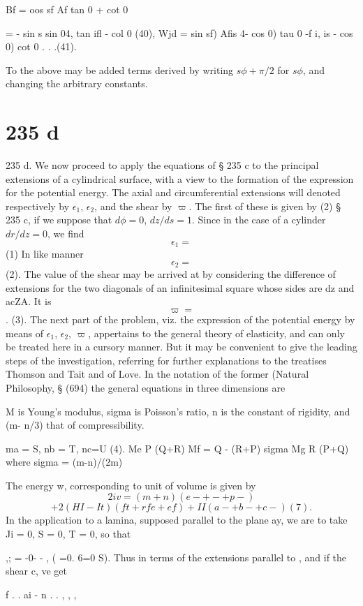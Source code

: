 Bf = oos sf Af tan  0 + cot  0

= - sin s sin 04, tan ifl - col  0 (40), Wjd = sin sf) Afis 4- cos 0) tau  0
-f i, is - cos 0) cot  0 . . .(41).

To the above may be added terms derived by writing \( s \phi + \pi/2\) for
\( s \phi\), and changing the arbitrary constants.
\section{235 d}%
235 d. We now proceed to apply the equations of § 235 c to the principal
extensions of a cylindrical surface, with a view to the formation of the
expression for the potential energy. The axial and circumferential extensions
will denoted respectively by
\(\epsilon_1\),
\(\epsilon_2\), and the shear by
\( \varpi \).
The first of these is given by (2) § 235 c, if we
suppose that \( d\phi =0\), \(dz/ds=1\).  Since in the case of a cylinder
\(dr/dz=0\), we find
\[\epsilon_1=\]
(1) In like manner
\[\epsilon_2=\]
(2).  The value of the shear may
be arrived at by considering the difference of extensions for the two
diagonals of an infinitesimal square whose sides are dz and acZA. It is
\[ \varpi = \].
(3).  The next part of the problem, viz. the expression of the
potential energy by means of \(\epsilon_1\), \(\epsilon_2\), \(\varpi\),
appertains to the general theory of elasticity, and can only be treated here in
a cursory manner. But it may be convenient to give the leading steps of the
investigation, referring for further explanations to the treatises
Thomson and Tait and of Love. In the notation of the former
(Natural Philosophy, § (694) the general equations in three dimensions are

M is Young’s modulus, sigma is Poisson’s ratio, n is the constant of
rigidity, and (m- n/3) that of compressibility.

ma = S, nb = T, nc=U (4).
Me   P   (Q+R)
Mf = Q - (R+P) sigma
Mg   R   (P+Q)
where sigma = (m-n)/(2m)

The energy w, corresponding to unit of volume is given by
\[
 2iv = (m + n) (e- + - + p-)
\]
\[
+ 2 (HI - It) ( ft +rfe + ef) + II (a- + b- + c-) (7 ).
\]
In the application to a lamina, supposed parallel to the plane ay, we are to
take Ji = 0, S = 0, T = 0, so that

,; = -0- -  , ( =0. 6=0 S).  Thus in terms of the extensions parallel to
, and if the shear c, ve get

f . . ai - n . . , , ,

